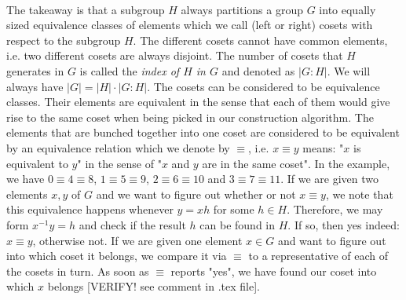 \paragraph{}
The takeaway is that a subgroup $H$ always partitions a group $G$ into equally sized equivalence classes of elements which we call (left or right) cosets with respect to the subgroup $H$. The different cosets cannot have common elements, i.e. two different cosets are always disjoint. The number of cosets that $H$ generates in $G$ is called the \emph{index of $H$ in $G$} and denoted as $|G : H|$. We will always have $|G| = |H| \cdot |G : H|$. The cosets can be considered to be equivalence classes. Their elements are equivalent in the sense that each of them would give rise to the same coset when being picked in our construction algorithm. The elements that are bunched together into one coset are considered to be equivalent by an equivalence relation which we denote by $\equiv$, i.e. $x \equiv y$ means: "$x$ is equivalent to $y$" in the sense of "$x$ and $y$ are in the same coset". In the example, we have $0 \equiv 4 \equiv 8$, $1 \equiv 5 \equiv 9$, $2 \equiv 6 \equiv 10$ and $3 \equiv 7 \equiv 11$. If we are given two elements $x,y$ of $G$ and we want to figure out whether or not $x \equiv y$, we note that this equivalence happens whenever $y = x h$ for some $h \in H$. Therefore, we may form $x^{-1} y = h$ and check if the result $h$ can be found in $H$. If so, then yes indeed: $x \equiv y$, otherwise not. If we are given one element $x \in G$ and want to figure out into which coset it belongs, we compare it via $\equiv$ to a representative of each of the cosets in turn. As soon as $\equiv$ reports "yes", we have found our coset into which $x$ belongs [VERIFY! see comment in .tex file].




%
%
%
%

